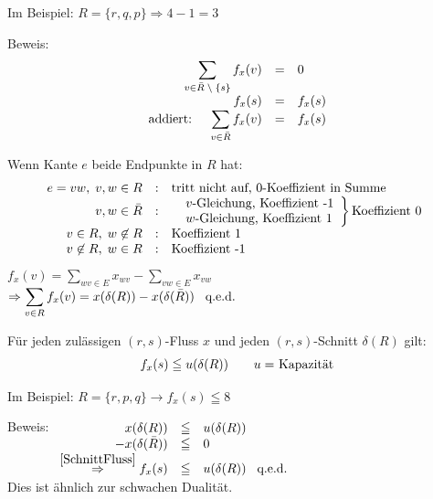 Im Beispiel: $R=\{r,q,p\} \Rightarrow 4-1 = 3$

Beweis: 
\[\begin{array}{rcl}
\displaystyle \sum_{v \in \bar{R} \;\backslash\; \{s\}} f_{x}(v) &=&0\\
f_{x} (s) &=& f_{x}(s)\\
\mbox{addiert: } \hspace{3mm} \displaystyle \sum_{v \in \bar{R}} f_{x}(v)
&=& f_{x}(s) 
\end{array}\]

Wenn Kante $e$ beide Endpunkte in $R$ hat:
\[\begin{array}{rcl}
e = v w, \; v,w \in R&:& \mbox{tritt nicht auf, 0-Koeffizient in Summe}\\
v, w \in \bar{R}&:& \begin{array}[t]{l}
\left. \begin{array}{l} 
\mbox{$v$-Gleichung, Koeffizient -1}\\
\mbox{$w$-Gleichung, Koeffizient 1}
\end{array}
\right\} \mbox{Koeffizient 0} \end{array}\\
v \in R, \; w \not\in  R&:& \mbox{Koeffizient 1}\\
v \not\in R, \; w \in R&:& \mbox{Koeffizient -1}
\end{array}
\]
$f_{x}(v) = \displaystyle \sum_{w v \in E} x_{w v} - \sum_{v w \in E}
x_{v w}$\\
$\Rightarrow \displaystyle \sum_{v \in R} f_{x}(v) = x(\delta(R)) - x (\delta(\bar{R}))
\hspace{3mm} \mbox{q.e.d.}$

\begin{korollar}\label{FlussSchnittKap}
Für jeden zulässigen $(r,s)$-Fluss $x$ und jeden $(r,s)$-Schnitt
$\delta(R)$ gilt:
\[f_{x}(s) \leqq u (\delta(R)) \hspace{7mm} \mbox{$u = $ Kapazität}\]
\end{korollar}
Im Beispiel: $ R = \{r,p,q\} \rightarrow f_{x}(s)\leqq 8$

Beweis: $\begin{array}[t]{rcl}
x(\delta(R)) &\leqq & u (\delta(R))\\
-x (\delta(\bar{R})) &\leqq &0\\
\stackrel{\ref{SchnittFluss}}{\Rightarrow} f_{x}(s) &\leqq & u (\delta(R))
\hspace{3mm} \mbox{q.e.d.}
\end{array}$\\
Dies ist ähnlich zur schwachen Dualität.


